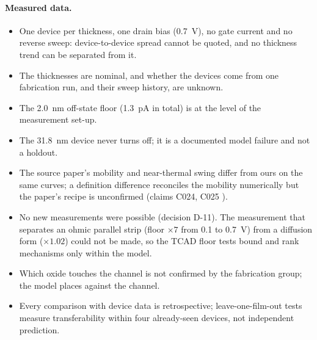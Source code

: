 \paragraph{Measured data.}
\begin{itemize}
\item One device per thickness, one drain bias (\SI{0.7}{V}), no gate current and no reverse sweep: device-to-device
spread cannot be quoted, and no thickness trend can be separated from it. %
\item The thicknesses are nominal, and whether the devices come from one fabrication run, and their sweep history,
are unknown. %
\item The \SI{2.0}{nm} off-state floor (\SI{1.3}{pA} in total) is at the level of the measurement set-up. %
\item The \SI{31.8}{nm} device never turns off; it is a documented model failure and not a holdout. %
\item The source paper's mobility and near-thermal swing differ from ours on the same curves; a definition difference
reconciles the mobility numerically but the paper's recipe is unconfirmed (claims C024, C025 ). %
\item No new measurements were possible (decision D-11). The measurement that separates an ohmic parallel strip
(floor $\times7$ from 0.1 to \SI{0.7}{V}) from a diffusion form ($\times1.02$) could not be made, so the TCAD floor
tests bound and rank mechanisms only within the model. %
\item Which oxide touches the channel is not confirmed by the fabrication group; the model places \AlO{} against the
channel. %
\item Every comparison with device data is retrospective; leave-one-film-out tests measure transferability within four
already-seen devices, not independent prediction. %
\end{itemize}

